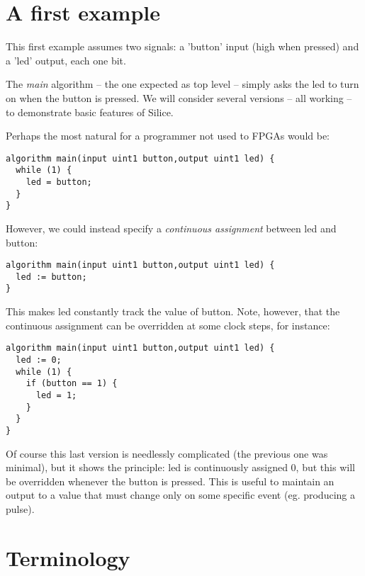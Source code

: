 \documentclass[a4]{article}
\newcommand\silice{Silice}
\begin{document}
\section{A first example}

This first example assumes two signals: a 'button' input (high when pressed) and a 'led' output, each one bit.

The \textit{main} algorithm -- the one expected as top level -- simply asks the led to turn on when the button is pressed. We will consider several versions -- all working -- to demonstrate basic features of \silice{}.

Perhaps the most natural for a programmer not used to FPGAs would be:

\begin{verbatim}
algorithm main(input uint1 button,output uint1 led) {  
  while (1) {
    led = button;
  }
}
\end{verbatim}

However, we could instead specify a \textit{continuous assignment} between led and button:

\begin{verbatim}
algorithm main(input uint1 button,output uint1 led) {  
  led := button;
}
\end{verbatim}

This makes led constantly track the value of button. Note, however, that the continuous assignment can be overridden at some clock steps, for instance:

\begin{verbatim}
algorithm main(input uint1 button,output uint1 led) {  
  led := 0;
  while (1) {
    if (button == 1) {
      led = 1;
    }
  }  
}
\end{verbatim}

Of course this last version is needlessly complicated (the previous one was minimal), but it shows the principle: led is continuously assigned 0, but this will be overridden whenever the button is pressed. This is useful to maintain an output to a value that must change only on some specific event (eg. producing a pulse).


\section{Terminology}
\end{document}
